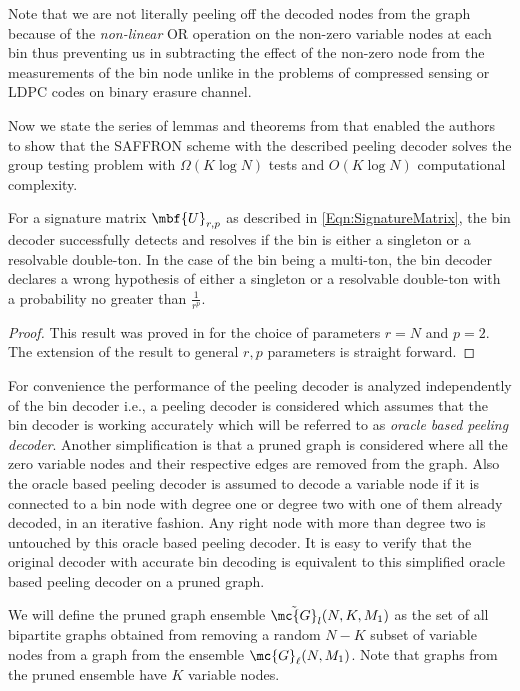 \documentclass[conference,twocolumn]{IEEEtran}
\begin{document}
\begin{Remark}
 Note that we are not literally peeling off the decoded nodes from the graph because of the \textit{non-linear} OR operation on the non-zero variable nodes at each bin thus preventing us in subtracting the effect of the non-zero node from the measurements of the bin node unlike in the problems of compressed sensing or LDPC codes on binary erasure channel.
\end{Remark}

Now we state the series of lemmas and theorems from \cite{lee2015saffron} that enabled the authors to show that the SAFFRON scheme with the described peeling decoder solves the group testing problem with $\Omega( K\log N)$ tests and $O(K\log N)$ computational complexity.

\begin{lemma}
\label{Lem:BinDecoderAnalysis}
For a signature matrix $\mbf{U}_{r,p}$ as described in \eqref{Eqn:SignatureMatrix}, the bin decoder successfully detects and resolves if the bin is either a singleton or a resolvable double-ton. In the case of the bin being a multi-ton, the bin decoder declares a wrong hypothesis of either a singleton or a resolvable double-ton with a probability no greater than $\frac{1}{r^p}$.
\end{lemma}
\begin{proof}
This result was proved in \cite{lee2015saffron} for the choice of parameters $r=N$ and $p=2$. The extension of the result to general $r,p$ parameters is straight forward.
\end{proof}

For convenience the performance of the peeling decoder is analyzed independently of the bin decoder i.e., a peeling decoder is considered which assumes that the bin decoder is working accurately which will be referred to as \textit{oracle based peeling decoder}. Another simplification is that a pruned graph is considered where all the zero variable nodes and their respective edges are removed from the graph. Also the oracle based peeling decoder is assumed to decode a variable node if it is connected to a bin node with degree one or degree two with one of them already decoded, in an iterative fashion. Any right node with more than degree two is untouched by this oracle based peeling decoder. It is easy to verify that the original decoder with accurate bin decoding is equivalent to this simplified oracle based peeling decoder on a pruned graph.
\begin{definition}
We will define the pruned graph ensemble $\tilde{\mc{G}}_l(N,K,M_1)$ as the set of all bipartite graphs obtained from removing a random $N-K$ subset of variable nodes from a graph from the ensemble $\mc{G}_{\ell}(N,M_1)$. Note that graphs from the pruned ensemble have $K$ variable nodes. 
\end{definition}	
\end{document}
